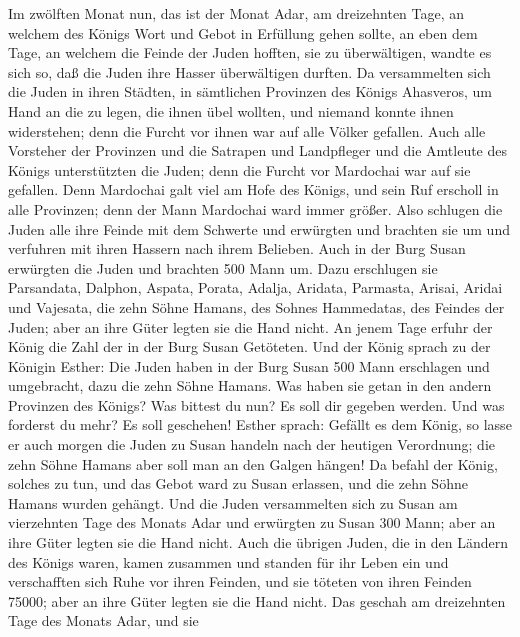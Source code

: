  Im zwölften Monat nun, das ist der Monat Adar, am
dreizehnten Tage, an welchem des Königs Wort und Gebot in Erfüllung
gehen sollte, an eben dem Tage, an welchem die Feinde der Juden hofften,
sie zu überwältigen, wandte es sich so, daß die Juden ihre Hasser
überwältigen durften.  Da versammelten sich die Juden in
ihren Städten, in sämtlichen Provinzen des Königs Ahasveros, um Hand an
die zu legen, die ihnen übel wollten, und niemand konnte ihnen
widerstehen; denn die Furcht vor ihnen war auf alle Völker gefallen.
 Auch alle Vorsteher der Provinzen und die Satrapen und
Landpfleger und die Amtleute des Königs unterstützten die Juden; denn
die Furcht vor Mardochai war auf sie gefallen.  Denn
Mardochai galt viel am Hofe des Königs, und sein Ruf erscholl in alle
Provinzen; denn der Mann Mardochai ward immer größer. 
Also schlugen die Juden alle ihre Feinde mit dem Schwerte und erwürgten
und brachten sie um und verfuhren mit ihren Hassern nach ihrem Belieben.
 Auch in der Burg Susan erwürgten die Juden und brachten
500 Mann um.  Dazu erschlugen sie Parsandata,
 Dalphon, Aspata, Porata,  Adalja, Aridata,
Parmasta, Arisai, Aridai und Vajesata,  die zehn Söhne
Hamans, des Sohnes Hammedatas, des Feindes der Juden; aber an ihre Güter
legten sie die Hand nicht.  An jenem Tage erfuhr der
König die Zahl der in der Burg Susan Getöteten.  Und der
König sprach zu der Königin Esther: Die Juden haben in der Burg Susan
500 Mann erschlagen und umgebracht, dazu die zehn Söhne Hamans. Was
haben sie getan in den andern Provinzen des Königs? Was bittest du nun?
Es soll dir gegeben werden. Und was forderst du mehr? Es soll geschehen!
 Esther sprach: Gefällt es dem König, so lasse er auch
morgen die Juden zu Susan handeln nach der heutigen Verordnung; die zehn
Söhne Hamans aber soll man an den Galgen hängen!  Da
befahl der König, solches zu tun, und das Gebot ward zu Susan erlassen,
und die zehn Söhne Hamans wurden gehängt.  Und die Juden
versammelten sich zu Susan am vierzehnten Tage des Monats Adar und
erwürgten zu Susan 300 Mann; aber an ihre Güter legten sie die Hand
nicht.  Auch die übrigen Juden, die in den Ländern des
Königs waren, kamen zusammen und standen für ihr Leben ein und
verschafften sich Ruhe vor ihren Feinden, und sie töteten von ihren
Feinden 75000; aber an ihre Güter legten sie die Hand nicht.
 Das geschah am dreizehnten Tage des Monats Adar, und sie
